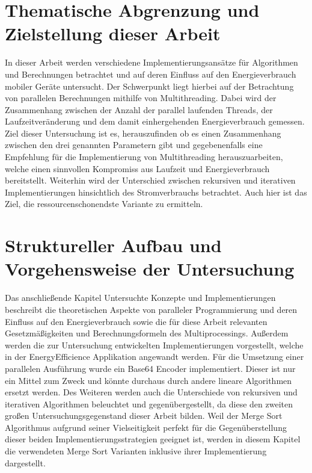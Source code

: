 \section{Thematische Abgrenzung und Zielstellung dieser Arbeit}
In dieser Arbeit werden verschiedene Implementierungsansätze für Algorithmen und Berechnungen betrachtet und auf deren Einfluss auf den Energieverbrauch mobiler Geräte untersucht. Der Schwerpunkt liegt hierbei auf der Betrachtung von parallelen Berechnungen mithilfe von Multithreading. Dabei wird der Zusammenhang zwischen der Anzahl der parallel laufenden Threads, der Laufzeitveränderung und dem damit einhergehenden Energieverbrauch gemessen.
Ziel dieser Untersuchung ist es, herauszufinden ob es einen Zusammenhang zwischen den drei genannten Parametern gibt und gegebenenfalls eine Empfehlung für die Implementierung von Multithreading herauszuarbeiten, welche einen sinnvollen Kompromiss aus Laufzeit und Energieverbrauch bereitstellt.
Weiterhin wird der Unterschied zwischen rekursiven und iterativen Implementierungen hinsichtlich des Stromverbrauchs betrachtet. Auch hier ist das Ziel, die ressourcenschonendste Variante zu ermitteln.


\section{Struktureller Aufbau und Vorgehensweise der Untersuchung}

Das anschließende Kapitel \glqq Untersuchte Konzepte und Implementierungen\grqq{} beschreibt die theoretischen Aspekte von paralleler Programmierung und deren Einfluss auf den Energieverbrauch sowie die für diese Arbeit relevanten Gesetzmäßigkeiten und Berechnungsformeln des Multiprocessings. Außerdem werden die zur Untersuchung entwickelten Implementierungen vorgestellt, welche in der \glqq EnergyEfficience\grqq{} Applikation angewandt werden. Für die Umsetzung einer parallelen Ausführung wurde ein Base64 Encoder implementiert. Dieser ist nur ein Mittel zum Zweck und könnte durchaus durch andere lineare Algorithmen ersetzt werden. Des Weiteren werden auch die Unterschiede von rekursiven und iterativen Algorithmen beleuchtet und gegenübergestellt, da diese den zweiten großen Untersuchungsgegenstand dieser Arbeit bilden. Weil der Merge Sort Algorithmus aufgrund seiner Vielseitigkeit perfekt für die Gegenüberstellung dieser beiden Implementierungsstrategien geeignet ist, werden in diesem Kapitel die verwendeten Merge Sort Varianten inklusive ihrer Implementierung dargestellt.

